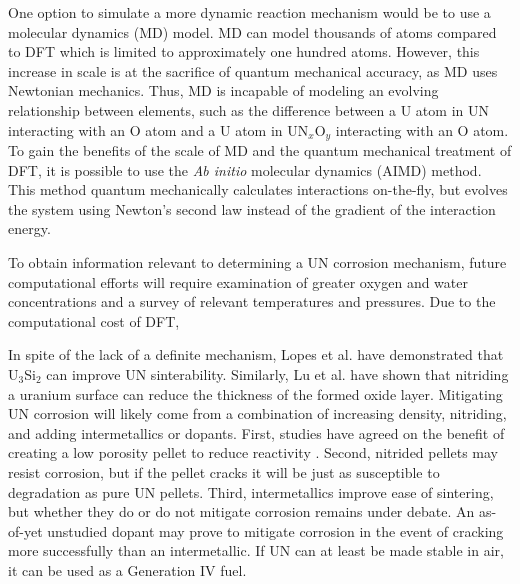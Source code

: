 \documentclass[11pt]{article}
\begin{document}
\begin{multicols}{2}
One option to simulate a more dynamic reaction mechanism would be to use a molecular dynamics (MD) model. MD can model thousands of atoms compared to DFT which is limited to approximately one hundred atoms. However, this increase in scale is at the sacrifice of quantum mechanical accuracy, as MD uses Newtonian mechanics. Thus, MD is incapable of modeling an evolving relationship between elements, such as the difference between a U atom in UN interacting with an O atom and a U atom in UN$_{x}$O$_{y}$ interacting with an O atom. To gain the benefits of the scale of MD and the quantum mechanical treatment of DFT, it is possible to use the \textit{Ab initio} molecular dynamics (AIMD) method. This method quantum mechanically calculates interactions on-the-fly, but evolves the system using Newton's second law instead of the gradient of the interaction energy. 
\par 
To obtain information relevant to determining a UN corrosion mechanism, future computational efforts will require examination of greater oxygen and water concentrations and a survey of relevant temperatures and pressures. Due to the computational cost of DFT, 
\par In spite of the lack of a definite mechanism, Lopes et al. \cite{Lopes2017} have demonstrated that U$_{3}$Si$_{2}$ can improve UN sinterability. Similarly, Lu et al. \cite{Lu2016} have shown that nitriding a uranium surface can reduce the thickness of the formed oxide layer.
Mitigating UN corrosion will likely come from a combination of increasing density, nitriding, and adding intermetallics or dopants. First, studies have agreed on the benefit of creating a low porosity pellet to reduce reactivity \cite{Lopes2017,Johnson2016,Jolkkonen2017}. Second, nitrided pellets may resist corrosion, but if the pellet cracks it will be just as susceptible to degradation as pure UN pellets. Third, intermetallics improve ease of sintering, but whether they do or do not mitigate corrosion remains under debate. An as-of-yet unstudied dopant may prove to mitigate corrosion in the event of cracking more successfully than an intermetallic. If UN can at least be made stable in air, it can be used as a Generation IV fuel.

\end{multicols}
\end{document}
